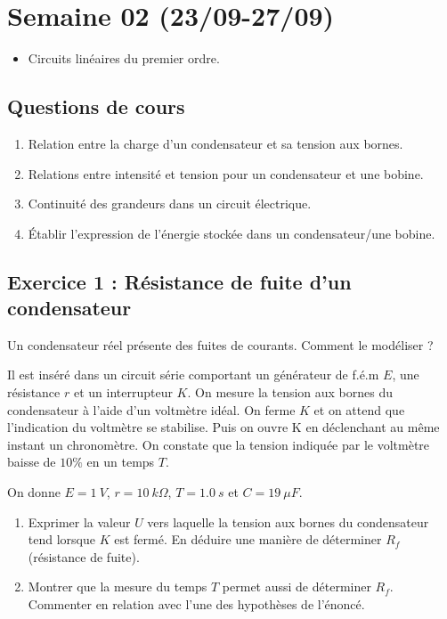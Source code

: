 \section{Semaine 02 (23/09-27/09) }


\begin{itemize}
	\item Circuits linéaires du premier ordre.
\end{itemize}

\subsection{Questions de cours}
\begin{enumerate}
	\item Relation entre la charge d'un condensateur et sa tension aux bornes.
	\item Relations entre intensité et tension pour un condensateur et une bobine.
	\item Continuité des grandeurs dans un circuit électrique.
	\item Établir l'expression de l'énergie stockée dans un condensateur/une bobine.
\end{enumerate}

\subsection{Exercice 1 : Résistance de fuite d'un condensateur}

Un condensateur réel présente des fuites de courants. Comment le modéliser ?

Il est inséré dans un circuit série comportant un générateur de f.é.m $E$, une résistance $r$ et un interrupteur $K$. On mesure la tension aux bornes du condensateur à l'aide d'un voltmètre idéal. On ferme $K$ et on attend que l'indication du voltmètre se stabilise. Puis on ouvre K en déclenchant au même instant un chronomètre. On constate que la tension indiquée par le voltmètre baisse de $10\%$ en un temps $T$.

On donne $E = \SI{1}{V}$, $r=\SI{10}{k\Omega}$, $T=\SI{1.0}{s}$ et $C=\SI{19}{\mu F}$.

\begin{enumerate}
	\item Exprimer la valeur $U$ vers laquelle la tension aux bornes du condensateur tend lorsque $K$ est fermé. En déduire une manière de déterminer $R_f$ (résistance de fuite).
	\item Montrer que la mesure du temps $T$ permet aussi de déterminer $R_f$. Commenter en relation avec l'une des hypothèses de l'énoncé.
\end{enumerate}

